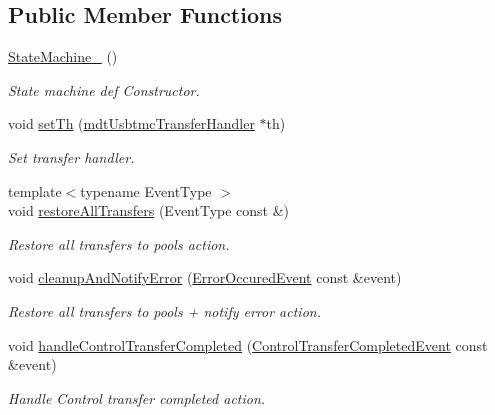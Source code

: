 \subsection*{Public Member Functions}
\begin{DoxyCompactItemize}
\item 
\hyperlink{structmdt_usbtmc_transfer_handler_state_machine_1_1_state_machine___a42bf6ab0d760eb63fd4fd8216a7d7c6f}{State\-Machine\-\_\-} ()
\begin{DoxyCompactList}\small\item\em State machine def Constructor. \end{DoxyCompactList}\item 
void \hyperlink{structmdt_usbtmc_transfer_handler_state_machine_1_1_state_machine___a40b35455287231acf787a17941b839d0}{set\-Th} (\hyperlink{classmdt_usbtmc_transfer_handler}{mdt\-Usbtmc\-Transfer\-Handler} $\ast$th)
\begin{DoxyCompactList}\small\item\em Set transfer handler. \end{DoxyCompactList}\item 
{\footnotesize template$<$typename Event\-Type $>$ }\\void \hyperlink{structmdt_usbtmc_transfer_handler_state_machine_1_1_state_machine___ad79d997e0137b5574bbadf2add4667ce}{restore\-All\-Transfers} (Event\-Type const \&)
\begin{DoxyCompactList}\small\item\em Restore all transfers to pools action. \end{DoxyCompactList}\item 
void \hyperlink{structmdt_usbtmc_transfer_handler_state_machine_1_1_state_machine___aa35b9974ba542ed12d455ffe86cdd48e}{cleanup\-And\-Notify\-Error} (\hyperlink{structmdt_usbtmc_transfer_handler_state_machine_1_1_error_occured_event}{Error\-Occured\-Event} const \&event)
\begin{DoxyCompactList}\small\item\em Restore all transfers to pools + notify error action. \end{DoxyCompactList}\item 
void \hyperlink{structmdt_usbtmc_transfer_handler_state_machine_1_1_state_machine___a9020d31535b7e2b14cb69e9216f3001e}{handle\-Control\-Transfer\-Completed} (\hyperlink{structmdt_usbtmc_transfer_handler_state_machine_1_1_control_transfer_completed_event}{Control\-Transfer\-Completed\-Event} const \&event)
\begin{DoxyCompactList}\small\item\em Handle Control transfer completed action. \end{DoxyCompactList}\item 

\end{DoxyCompactItemize}
